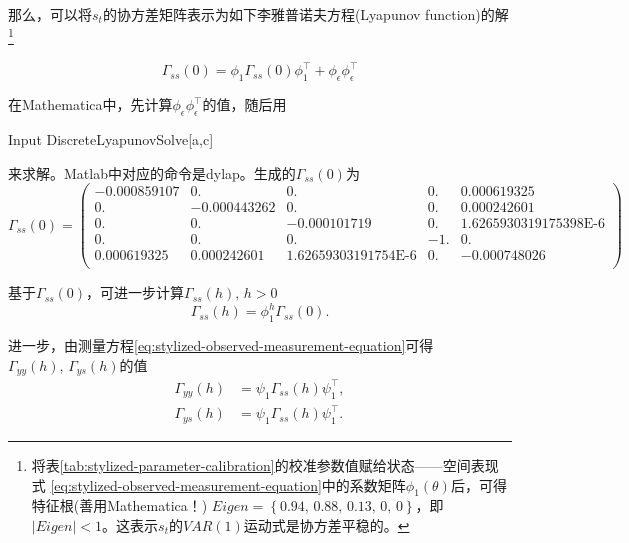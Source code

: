 那么，可以将$s_{t}$的协方差矩阵表示为如下李雅普诺夫方程(Lyapunov function)的解\footnote{
将表\ref{tab:stylized-parameter-calibration}的校准参数值赋给状态——空间表现式
\eqref{eq:stylized-observed-measurement-equation}中的系数矩阵$\phi_{1}\left(\theta \right)$后，可得特征根(善用Mathematica！)
$Eigen = \left\{ 0.94,\, 0.88,\, 0.13,\, 0,\, 0 \right\}$，即$\left| Eigen \right| <1$。这表示$s_{t}$的$VAR(1)$运动式是协方差平稳的。}

\begin{equation}
  \label{eq:stylized-ssrep-lyapunov-func}
  \Gamma_{ss} \left( 0 \right) = \phi_{1} \Gamma_{ss} \left( 0 \right) \phi_{1}^{\top} + \phi_{\epsilon} \phi_{\epsilon}^{\top}
\end{equation}

\begin{algorithm}
  在Mathematica中，先计算$\phi_{\epsilon} \phi_{\epsilon}^{\top}$的值，随后用
\begin{mmaCell}{Input}
DiscreteLyapunovSolve[a,c]
\end{mmaCell}
来求解。Matlab中对应的命令是dylap。生成的$\Gamma_{ss} \left(0 \right)$为
\begin{equation*}
  \Gamma_{ss} \left(0 \right) =
  \begin{pmatrix}%
   -0.000859107 & 0. & 0. & 0. & 0.000619325 \\
   0. & -0.000443262 & 0. & 0. & 0.000242601 \\
   0. & 0. & -0.000101719 & 0. & \text{1.6265930319175398E-6} \\
   0. & 0. & 0. & -1. & 0. \\
   0.000619325 & 0.000242601 & \text{1.62659303191754E-6} & 0. &
     -0.000748026 \\
  \end{pmatrix}
\end{equation*}
\end{algorithm}

基于$\Gamma_{ss} \left(0 \right)$，可进一步计算$\Gamma_{ss}\left( h \right), \, h >0$
\begin{equation}
  \label{eq:stylized-ssrep-cov-ss-h}
  \Gamma_{ss}\left( h \right) = \phi_{1}^{h} \Gamma_{ss}\left( 0 \right).
\end{equation}

进一步，由测量方程\eqref{eq:stylized-observed-measurement-equation}可得$\Gamma_{yy} \left( h \right), \, \Gamma_{ys} \left( h \right)$的值
\begin{align}
  \label{eq:stylized-ssrep-cov-yy-h}
  \Gamma_{yy} \left( h \right) & = \psi_{1} \Gamma_{ss} \left( h \right) \psi_{1}^{\top}, \\
  \label{eq:stylized-ssrep-cov-ys-h}
   \Gamma_{ys} \left( h \right) & = \psi_{1} \Gamma_{ss} \left( h \right) \psi_{1}^{\top}.
\end{align}

